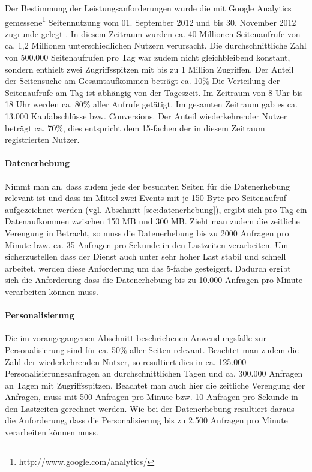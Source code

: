 Der Bestimmung der Leistungsanforderungen wurde die mit Google Analytics gemessene\footnote{http://www.google.com/analytics/} Seitennutzung vom 01. September 2012 und bis 30. November 2012 zugrunde gelegt . In diesem Zeitraum wurden ca. 40 Millionen Seitenaufrufe von ca. 1,2 Millionen unterschiedlichen Nutzern verursacht. Die durchschnittliche Zahl von 500.000 Seitenaufrufen pro Tag war zudem nicht gleichbleibend konstant, sondern enthielt zwei Zugriffsspitzen mit bis zu 1 Million Zugriffen. Der Anteil der Seitensuche am Gesamtaufkommen beträgt ca. 10\% Die Verteilung der Seitenaufrufe am Tag ist abhängig von der Tageszeit. Im Zeitraum von 8 Uhr bis 18 Uhr werden ca. 80\% aller Aufrufe getätigt. Im gesamten Zeitraum gab es ca. 13.000 Kaufabschlüsse bzw. Conversions. Der Anteil wiederkehrender Nutzer beträgt ca. 70\%, dies entspricht dem 15-fachen der in diesem Zeitraum registrierten Nutzer.

\paragraph{Datenerhebung} Nimmt man an, dass zudem jede der besuchten Seiten für die Datenerhebung relevant ist und dass im Mittel zwei Events mit je 150 Byte pro Seitenaufruf aufgezeichnet werden (vgl. Abschnitt \ref{sec:datenerhebung}), ergibt sich pro Tag ein Datenaufkommen zwischen 150 MB und 300 MB. Zieht man zudem die zeitliche Verengung in Betracht, so muss die Datenerhebung bis zu 2000 Anfragen pro Minute bzw. ca. 35 Anfragen pro Sekunde in den Lastzeiten verarbeiten. Um sicherzustellen dass der Dienst auch unter sehr hoher Last stabil und schnell arbeitet, werden diese Anforderung um das 5-fache gesteigert. Dadurch ergibt sich die Anforderung dass die Datenerhebung bis zu 10.000 Anfragen pro Minute verarbeiten können muss.

\paragraph{Personalisierung} Die im vorangegangenen Abschnitt beschriebenen Anwendungsfälle zur Personalisierung sind für ca. 50\% aller Seiten relevant. Beachtet man zudem die Zahl der wiederkehrenden Nutzer, so resultiert dies in ca. 125.000 Personalisierungsanfragen an durchschnittlichen Tagen und ca. 300.000 Anfragen an Tagen mit Zugriffsspitzen. Beachtet man auch hier die zeitliche Verengung der Anfragen, muss mit 500 Anfragen pro Minute bzw. 10 Anfragen pro Sekunde in den Lastzeiten gerechnet werden. Wie bei der Datenerhebung resultiert daraus die Anforderung, dass die Personalisierung bis zu 2.500 Anfragen pro Minute verarbeiten können muss. 


